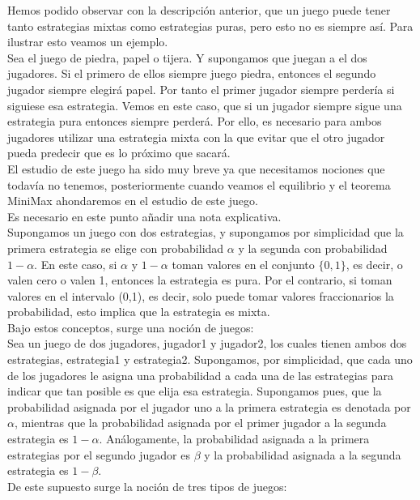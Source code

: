 \documentclass[10pt,a4paper]{book}
\begin{document}
Hemos podido observar con la descripción anterior, que un juego puede tener tanto estrategias mixtas como estrategias puras, pero esto no es siempre así. Para ilustrar esto veamos un ejemplo.\\

Sea el juego de piedra, papel o tijera. Y supongamos que juegan a el dos jugadores. Si el primero de ellos siempre juego piedra, entonces el segundo jugador siempre elegirá papel. Por tanto el primer jugador siempre perdería si siguiese esa estrategia. Vemos en este caso, que si un jugador siempre sigue una estrategia pura entonces siempre perderá. Por ello, es necesario para ambos jugadores utilizar una estrategia mixta con la que evitar que el otro jugador pueda predecir que es lo próximo que sacará. \\
El estudio de este juego ha sido muy breve ya que necesitamos nociones que todavía no tenemos, posteriormente cuando veamos el equilibrio y el teorema MiniMax ahondaremos en el estudio de este juego.\\


Es necesario en este punto añadir una nota explicativa. \\

Supongamos un juego con dos estrategias, y supongamos por simplicidad que la primera estrategia se elige con probabilidad $\alpha$ y la segunda con probabilidad $1- \alpha$. En este caso, si $\alpha$ y $1-\alpha$ toman valores en el conjunto $\{0,1\}$, es decir, o valen cero o valen 1, entonces la estrategia es pura. Por el contrario, si toman valores en el intervalo (0,1), es decir, solo puede tomar valores fraccionarios la probabilidad, esto implica que la estrategia es mixta. \\

Bajo estos conceptos, surge una noción de juegos:\\

Sea un juego de dos jugadores, jugador1 y jugador2, los cuales tienen ambos dos estrategias, estrategia1 y estrategia2. Supongamos, por simplicidad, que cada uno de los jugadores le asigna una probabilidad a cada una de las estrategias para indicar que tan posible es que elija esa estrategia. Supongamos pues, que la probabilidad asignada por el jugador uno a la primera estrategia es denotada por $\alpha$, mientras que la probabilidad asignada por el primer jugador a la segunda estrategia es $1-\alpha$. Análogamente, la probabilidad asignada a la primera estrategias por el segundo jugador es $\beta$ y la probabilidad asignada a la segunda estrategia es $1-\beta$.\\
De este supuesto surge la noción de tres tipos de juegos:\\
\end{document}
